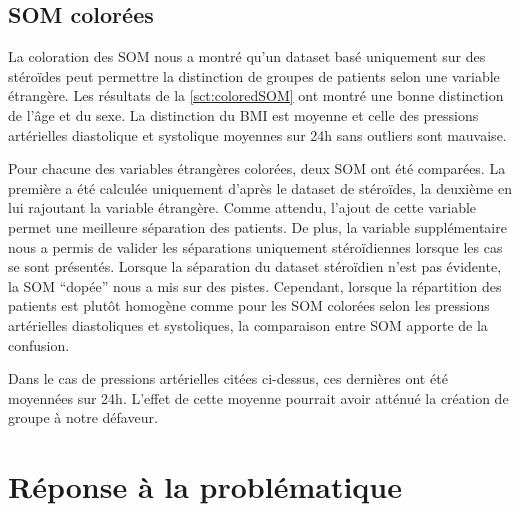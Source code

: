 \subsection{SOM colorées}
		
	
	La coloration des SOM nous a montré qu'un dataset basé uniquement sur des stéroïdes peut permettre la distinction de groupes de patients selon une variable étrangère. Les résultats de la \autoref{sct:coloredSOM} ont montré une bonne distinction de l'âge et du sexe. La distinction du BMI est moyenne et celle des pressions artérielles diastolique et systolique moyennes sur 24h sans outliers sont mauvaise.

	Pour chacune des variables étrangères colorées, deux SOM ont été comparées. La première a été calculée uniquement d'après le dataset de stéroïdes, la deuxième en lui rajoutant la variable étrangère. Comme attendu, l'ajout de cette variable permet une meilleure séparation des patients. De plus, la variable supplémentaire nous a permis de valider les séparations uniquement stéroïdiennes lorsque les cas se sont présentés. Lorsque la séparation du dataset stéroïdien n'est pas évidente, la SOM ``dopée'' nous a mis sur des pistes. Cependant, lorsque la répartition des patients est plutôt homogène comme pour les SOM colorées selon les pressions artérielles diastoliques et systoliques, la comparaison entre SOM apporte de la confusion. 

	Dans le cas de pressions artérielles citées ci-dessus, ces dernières ont été moyennées sur 24h. L'effet de cette moyenne pourrait avoir atténué la création de groupe à notre défaveur.

\section{Réponse à la problématique}

